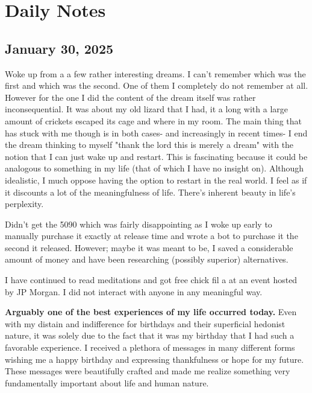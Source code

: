 \chapter{Daily Notes}

\newcommand{\dayentry}[1]{%
    \section{#1}
    \vspace{0.5em}
    \noindent %
}

\dayentry{January 30, 2025}

\noindent
Woke up from a a few rather interesting dreams. I can't remember which was the first and which was the second. One of them I completely do not remember at all. However for the one I did the content of the dream itself was rather inconsequential. It was about my old lizard that I had, it a long with a large amount of crickets escaped its cage and where in my room. The main thing that has stuck with me though is in both cases- and increasingly in recent times- I end the dream thinking to myself "thank the lord this is merely a dream" with the notion that I can just wake up and restart. This is fascinating because it could be analogous to something in my life (that of which I have no insight on). Although idealistic, I much oppose having the option to restart in the real world. I feel as if it discounts a lot of the meaningfulness of life. There's inherent beauty in life's perplexity.

\medskip\noindent
Didn't get the 5090 which was fairly disappointing as I woke up early to manually purchase it exactly at release time and wrote a bot to purchase it the second it released. However; maybe it was meant to be, I saved a considerable amount of money and have been researching (possibly superior) alternatives.

\medskip\noindent
I have continued to read meditations and got free chick fil a at an event hosted by JP Morgan. I did not interact with anyone in any meaningful way.

\medskip\noindent
\textbf{Arguably one of the best experiences of my life occurred today.} Even with my distain and indifference for birthdays and their superficial hedonist nature, it was solely due to the fact that it was my birthday that I had such a favorable experience. I received a plethora of messages in many different forms wishing me a happy birthday and expressing thankfulness or hope for my future. These messages were beautifully crafted and made me realize something very fundamentally important about life and human nature.

